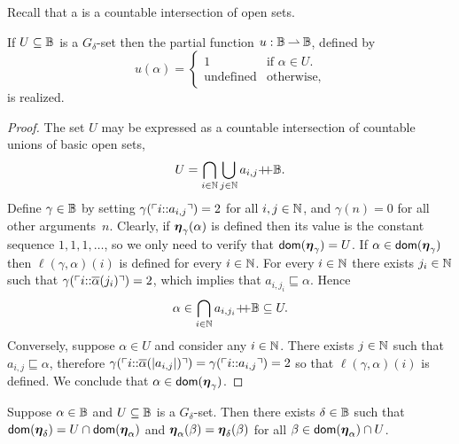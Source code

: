 %
Recall that a  is a countable intersection of open sets.

\begin{lemma}
  \label{th:G_delta_characteristic}%
  If $U \subseteq \mathbb{B}$ is a $G_\delta$-set then the partial
  function $u: \mathbb{B} \mathbin{\rightharpoonup} \mathbb{B}$, defined by
  \begin{equation*}
    u(\alpha) =
    \begin{cases}
      1 & \text{if $\alpha \in U$.}\\
      \text{undefined} & \text{otherwise,}
    \end{cases}
  \end{equation*}
  is realized.
\end{lemma}

\begin{proof}
  The set $U$ may be expressed as a countable intersection of countable unions of basic
  open sets,
  \begin{equation*}
    U = \bigcap_{i \in \mathbb{N}}
        \bigcup_{j \in \mathbb{N}} a_{i,j}{{+}\!\!{+}}\mathbb{B}.
  \end{equation*}
  Define $\gamma \in \mathbb{B}$ by setting
  $\gamma(\ulcorner i {:}{:} a_{i,j} \urcorner) = 2$ for all $i, j \in \mathbb{N}$,
  and $\gamma(n) = 0$ for all other arguments~$n$. Clearly, if
  $\text{\boldmath{$\eta$}}_{\gamma}(\alpha)$ is defined then its value is the constant
  sequence $1, 1, 1, \ldots$, so we only need to verify that
  $\mathsf{dom}(\text{\boldmath{$\eta$}}_\gamma) = U$. If $\alpha \in \mathsf{dom}(\text{\boldmath{$\eta$}}_\gamma)$ then
  $\ell(\gamma,\alpha)(i)$ is defined for every $i \in \mathbb{N}$.
  For every $i \in \mathbb{N}$ there exists $j_i \in \mathbb{N}$ such that $\gamma
  (\ulcorner i {:}{:} \overline{\alpha}(j_i) \urcorner) = 2$, which implies that $
  a_{i, j_i} \sqsubseteq \alpha$. Hence
  \begin{equation*}
    \alpha \in \bigcap_{i \in \mathbb{N}} a_{i, j_i}{{+}\!\!{+}}\mathbb{B} \subseteq U.
  \end{equation*}
  Conversely, suppose $\alpha \in U$ and consider any $i \in \mathbb{N}$.
  There exists $j \in \mathbb{N}$ such that $a_{i,j} \sqsubseteq \alpha$,
  therefore $\gamma (\ulcorner i {:}{:} \overline{\alpha}(|a_{i,j}|) \urcorner) =
  \gamma(\ulcorner i {:}{:} a_{i,j} \urcorner) = 2$ so that $\ell(\gamma,\alpha)(i)$ is defined. We conclude that $\alpha \in
  \mathsf{dom}(\text{\boldmath{$\eta$}}_\gamma)$.
\end{proof}

\begin{lemma}
  \label{th:restrict_G_delta}%
  Suppose $\alpha \in \mathbb{B}$ and $U \subseteq \mathbb{B}$ is a $G_\delta$-set.
  Then there exists $\delta \in \mathbb{B}$ such that
  $\mathsf{dom}(\text{\boldmath{$\eta$}}_\delta) = U \cap \mathsf{dom}(\text{\boldmath{$\eta$}}_\alpha)$
  and
  $\text{\boldmath{$\eta$}}_{\alpha}(\beta) = \text{\boldmath{$\eta$}}_{\delta}(\beta)$
  for all $\beta \in \mathsf{dom}(\text{\boldmath{$\eta$}}_\alpha) \cap U$.
\end{lemma}

